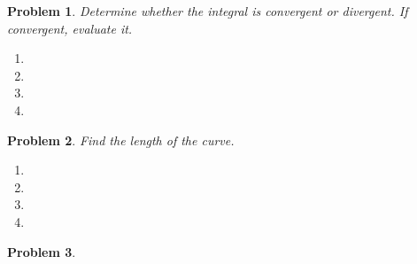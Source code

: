 \documentclass{article}
\renewcommand{\fcProblemRef}{\theproblem.\theenumi}
\newtheorem{problem}{Problem}
\begin{document}
\begin{problem} Determine whether the integral is convergent or divergent. If convergent, evaluate it.

\begin{multicols}{2}
\begin{enumerate}[ref={\fcProblemRef}]
\item 

\item 


\item 
\item 
\end{enumerate}
\end{multicols}
\end{problem}

\begin{problem}Find the length of the curve.
\begin{enumerate}[ref={\fcProblemRef}]
\item 
\item 
\item 
\item 
\end{enumerate}
\end{problem}




\begin{problem}


\end{problem}

\end{document}
